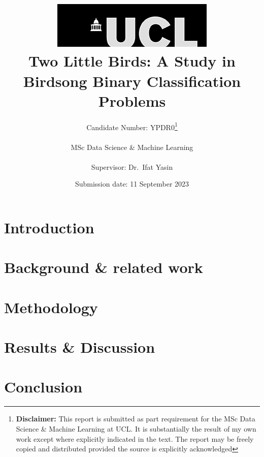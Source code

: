 \documentclass[12pt]{report}
\title{  	{ \includegraphics[scale=.5]{ucl_logo.png}}\\
{{\Huge Two Little Birds: A Study in Birdsong Binary Classification Problems}}\\
}
\date{Submission date: 11 September 2023}
\author{Candidate Number: YPDR0\thanks{
{\bf Disclaimer:}
This report is submitted as part requirement for the MSc Data Science \& Machine
Learning at UCL. It is substantially the result of my own work except where
explicitly indicated in the text. The report may be freely copied and
distributed provided the source is explicitly acknowledged
}
\\ \\
MSc Data Science \& Machine Learning\\ \\
Supervisor: Dr.\ Ifat Yasin}
\begin{document}
 
 \onehalfspacing
\maketitle
\begin{abstract}

\end{abstract}
\tableofcontents
\setcounter{page}{1}


\chapter{Introduction}\label{cp:intro}


\chapter{Background \& related work}


\chapter{Methodology}


\chapter{Results \& Discussion}


\chapter{Conclusion}


\appendix



\end{document}
